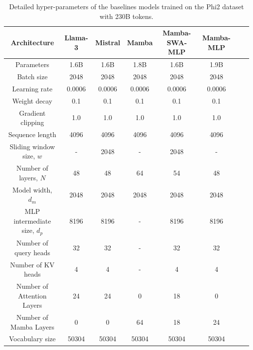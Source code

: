 \documentclass{article}
\begin{document}
\begin{table}[!ht]
\centering
\small
\caption{Detailed hyper-parameters of the baselines models trained on the Phi2 dataset with 230B tokens.}

\begin{tabular}{cccccccc}
\toprule
\textbf{Architecture} & \textbf{Llama-3 } & \textbf{Mistral} & \textbf{Mamba } & \textbf{Mamba-SWA-MLP } &  \textbf{Mamba-MLP } \\
\midrule
Parameters & 1.6B & 1.6B & 1.8B & 1.6B & 1.9B\\ 
Batch size & 2048 & 2048 & 2048 & 2048 & 2048\\
Learning rate & 0.0006 & 0.0006 &  0.0006 & 0.0006 & 0.0006 \\
Weight decay & 0.1 & 0.1 & 0.1 & 0.1 & 0.1 \\
Gradient clipping & 1.0 & 1.0 & 1.0 & 1.0 & 1.0 \\
Sequence length & 4096 & 4096 & 4096 & 4096 & 4096\\
\midrule
Sliding window size, $w$ & - & 2048 & - & 2048 & - \\
Number of layers, $N$ & 48 & 48 & 64 & 54 & 48 \\
Model width, $d_m$ & 2048 & 2048 & 2048 & 2048 & 2048\\
MLP intermediate size, $d_{p}$ & 8196 & 8196 & -  & 8196 & 8196\\
Number of query heads & 32 & 32 & - & 32 & 32\\
Number of KV heads & 4  &  4 & - & 4 & 4\\
Number of Attention Layers & 24 & 24 & 0 & 18 & 0\\
Number of Mamba Layers & 0 & 0 & 64 & 18 & 24\\
Vocabulary size & 50304 & 50304 & 50304 & 50304 & 50304\\
\bottomrule
\end{tabular}\label{hype_base}
\end{table}
\end{document}
